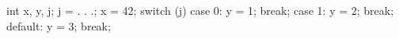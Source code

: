 int x, y, j;
j = . . .;
x = 42;
switch (j) {
    case  0: y = 1; break;
    case  1: y = 2; break;
    default: y = 3; break;
}